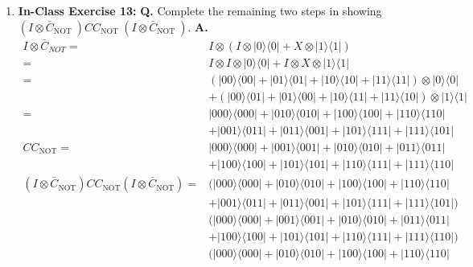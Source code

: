\documentclass[main.tex]{subfiles}
\begin{document}
\begin{enumerate}
\item[] \textbf{In-Class Exercise 13:} \textbf{Q.} Complete the remaining two steps in showing $\left(I \otimes \bar{C}_{\text {NOT }}\right) C C_{\text {NOT }}\left(I \otimes \bar{C}_{\text {NOT }}\right)$. \textbf{A.}
    \begin{align*}
        I \otimes \bar{C}_{N O T}=  & I \otimes(I \otimes|0\rangle\langle 0|+X \otimes| 1\rangle\langle 1|) \\
                                 =  & I \otimes I \otimes|0\rangle\langle 0|+I \otimes X \otimes| 1\rangle\langle 1| \\
                                 =  & (|00\rangle\langle 00|+| 01\rangle\langle 01|+| 10\rangle\langle 10|+| 11\rangle\langle 11|)
                                    \otimes|0\rangle\langle 0|\\
                                    & + (|00\rangle\langle 01|+| 01\rangle\langle 00|+| 10\rangle\langle 11|+| 11\rangle\langle 10|) \otimes|1\rangle\langle 1| \\
                                =   & |000\rangle\langle 000|+| 010\rangle\langle 010|+| 100\rangle\langle 100|+| 110\rangle\langle 110|\\
                                    & + |001\rangle\langle 011|+| 011\rangle\langle 001|+| 101\rangle\langle 111|+| 111\rangle\langle 101|\\
        C C_{\text{NOT}}        =   & |000\rangle\langle000|+|001\rangle\langle001|+|010\rangle\langle010|+|011\rangle\langle011|\\
                                    & + |100\rangle\langle100|+| 101\rangle\langle101|+|110\rangle\langle111|+|111\rangle\langle110|\\
        \left(I\otimes
        \bar{C}_{\text{NOT}}\right)
        C C_{\text{NOT}}
        \left(I\otimes
        \bar{C}_{\text{NOT}}\right) =   & (|000\rangle\langle000|+|010\rangle\langle010|+|100\rangle\langle100|+|110\rangle\langle110|\\
                                        & +|001\rangle\langle011|+|011\rangle\langle001|+|101\rangle\langle111|+|111\rangle\langle101|)\\
                                        & (|000\rangle\langle000|+|001\rangle\langle001|+|010\rangle\langle010|+|011\rangle\langle011|\\
                                        & +|100\rangle\langle100|+|101\rangle\langle101|+|110\rangle\langle111|+|111\rangle\langle110|)\\
                                        & (|000\rangle\langle000|+|010\rangle\langle010|+|100\rangle\langle100|+|110\rangle\langle110|\\

\end{align*}
\end{enumerate}
\end{document}
